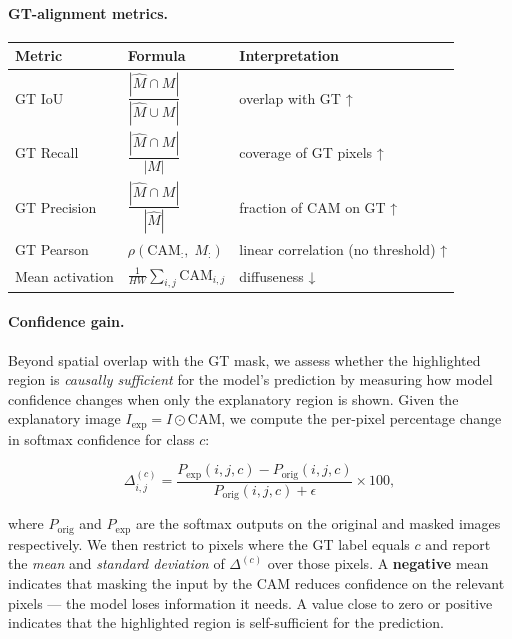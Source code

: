 \documentclass[12pt,a4paper]{article}
\theoremstyle{definition}
\begin{document}
\paragraph{GT-alignment metrics.}
\begin{center}
\begin{tabular}{lll}
\toprule
Metric & Formula & Interpretation \\
\midrule
GT IoU
  & $\dfrac{|\hat{M} \cap M|}{|\hat{M} \cup M|}$
  & overlap with GT ↑ \\[6pt]
GT Recall
  & $\dfrac{|\hat{M} \cap M|}{|M|}$
  & coverage of GT pixels ↑ \\[6pt]
GT Precision
  & $\dfrac{|\hat{M} \cap M|}{|\hat{M}|}$
  & fraction of CAM on GT ↑ \\[6pt]
GT Pearson
  & $\rho\!\left(\mathrm{CAM}_{:},\; M_{:}\right)$
  & linear correlation (no threshold) ↑ \\[4pt]
Mean activation
  & $\frac{1}{HW}\sum_{i,j}\mathrm{CAM}_{i,j}$
  & diffuseness ↓ \\
\bottomrule
\end{tabular}
\end{center}

\paragraph{Confidence gain.}
\label{sec:conf_gain}
Beyond spatial overlap with the GT mask, we assess whether the highlighted
region is \emph{causally sufficient} for the model's prediction by measuring
how model confidence changes when only the explanatory region is shown.
Given the explanatory image $I_{\text{exp}} = I \odot \mathrm{CAM}$, we
compute the per-pixel percentage change in softmax confidence for class $c$:

\[
  \Delta_{i,j}^{(c)}
  = \frac{P_{\text{exp}}(i,j,c) - P_{\text{orig}}(i,j,c)}
         {P_{\text{orig}}(i,j,c) + \epsilon} \times 100,
\]

where $P_{\text{orig}}$ and $P_{\text{exp}}$ are the softmax outputs on the
original and masked images respectively.  We then restrict to pixels where
the GT label equals $c$ and report the \emph{mean} and \emph{standard
deviation} of $\Delta^{(c)}$ over those pixels.  A \textbf{negative} mean
indicates that masking the input by the CAM reduces confidence on the
relevant pixels — the model loses information it needs.  A value close to
zero or positive indicates that the highlighted region is self-sufficient for
the prediction.
\end{document}
